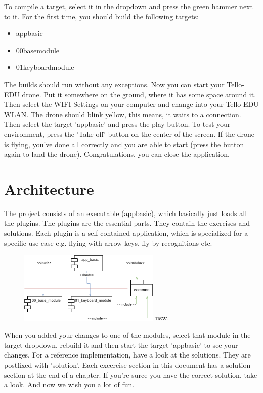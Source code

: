 \newpage
To compile a target, select it in the dropdown and press the green hammer next to it.
For the first time, you should build the following targets:
\begin{itemize}
    \item app\textunderscore basic
    \item 00\textunderscore base\textunderscore module
    \item 01\textunderscore keyboard\textunderscore module
\end{itemize}
The builds should run without any exceptions.
Now you can start your Tello-EDU drone. Put it somewhere on the ground, where it has some space around it.
Then select the WIFI-Settings on your computer and change into your Tello-EDU WLAN. The drone should blink yellow, this
means, it waits to a connection.\newline
Then select the target 'app\textunderscore basic' and press the play button. To test your environment, press the
'Take off' button on the center of the screen. If the drone is flying, you've done all correctly and you are
able to start (press the button again to land the drone). Congratulations, you can close the application.
\section{Architecture}
The project consists of an executable (app\textunderscore basic), which basically just loads all the plugins.
The plugins are the essential parts. They contain the exercises and solutions. Each plugin is a self-contained application,
which is specialized for a specific use-case e.g. flying with arrow keys, fly by recognitions etc.
\begin{figure}[H]
    \centering
    \includegraphics[width=0.6\textwidth]{../common/chapter_01/resources/02_architecture.png}
    usw.
\end{figure}
When you added your changes to one of the modules, select that module in the target dropdown, rebuild it and then
start the target 'app\textunderscore basic' to see your changes. For a reference implementation, have a look at the solutions.
They are postfixed with '\textunderscore solution'. Each excercise section in this document has a solution section at
the end of a chapter. If you're surce you have the correct solution, take a look.\newline
And now we wish you a lot of fun.